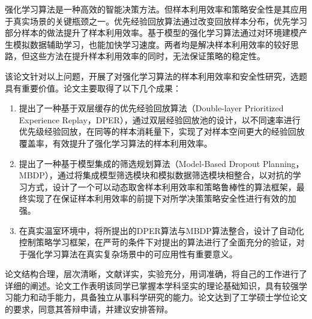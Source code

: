
\begin{comments}

强化学习算法是一种高效的智能决策方法。但样本利用效率和策略安全性是其应用于真实场景的关键瓶颈之一。优先经验回放算法通过改变回放样本分布，优先学习部分样本的做法提升了样本利用效率。基于模型的强化学习算法通过对环境建模产生模拟数据辅助学习，也能加快学习速度。两者均是解决样本利用效率的较好思路，但这些方法在提升样本利用效率的同时，无法保证策略的稳定性。

该论文针对以上问题，开展了对强化学习算法的样本利用效率和安全性研究，选题具有重要价值。论文主要取得了以下几个成果： 

\begin{enumerate}
    \item 提出了一种基于双层缓存的优先经验回放算法（Double-layer Prioritized Experience Replay，DPER），通过双层经验回放池的设计，以不同速率进行优先级经验回放，在同等的样本消耗量下，实现了对样本空间更大的经验回放覆盖率，有效提升了强化学习算法的样本利用效率。
    \item 提出了一种基于模型集成的筛选规划算法（Model-Based Dropout Planning，MBDP），通过将集成模型筛选模块和模拟数据筛选模块相整合，以对抗的学习方式，设计了一个可以动态取舍样本利用效率和策略鲁棒性的算法框架，最终实现了在保证样本利用效率的前提下对所学决策策略安全性进行有效的加强。
    \item 在真实温室环境中，将所提出的DPER算法与MBDP算法整合，设计了自动化控制策略学习框架，在严苛的条件下对提出的算法进行了全面充分的验证，对于强化学习算法在真实复杂场景中的可应用性有重要意义。
\end{enumerate}

 论文结构合理，层次清晰，文献详实，实验充分，用词准确，将自己的工作进行了详细的阐述。论文工作表明该同学已掌握本学科坚实的理论基础知识，具有较强学习能力和动手能力，具备独立从事科学研究的能力。论文达到了工学硕士学位论文的要求，同意其答辩申请，并建议安排答辩。

\end{comments}

